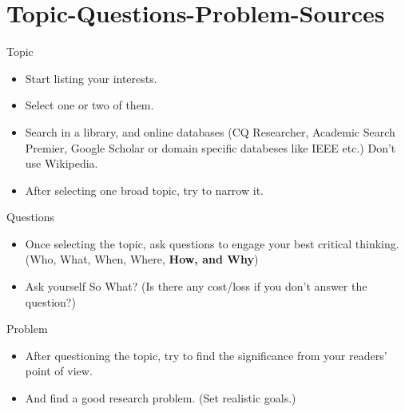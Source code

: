 \documentclass{beamer}
\begin{document}
\section{Topic-Questions-Problem-Sources}	
	\begin{frame}
		\begin{block}{Topic}
		\end{block}
		\begin{itemize}
			 \item Start listing your interests.
			\onslide<2-> \item Select one or two of them.
			\onslide<3-> \item Search in a library, and online databases (CQ Researcher, Academic Search Premier, Google Scholar or domain specific databeses like IEEE etc.) Don't use Wikipedia.
			\onslide<4-> \item After selecting one broad topic, try to narrow it. 
		\end{itemize}
	\end{frame}
	\begin{frame}
		\begin{block}{Questions}
		\end{block}
		\begin{itemize}
			 \item Once selecting the topic, ask questions to engage your best critical thinking. (Who, What, When, Where, \textbf{How, and Why})
			\onslide<2-> \item Ask yourself So What? (Is there any cost/loss if you don't answer the question?) 
		\end{itemize}
	\end{frame}
	\begin{frame}
		\begin{block}{Problem}
		\end{block}
		\begin{itemize}
			 \item After questioning the topic, try to find the significance from your readers' point of view. 
			\onslide<2-> \item And find a good research problem. (Set realistic goals.) 
		\end{itemize}
	\end{frame}
\end{document}
